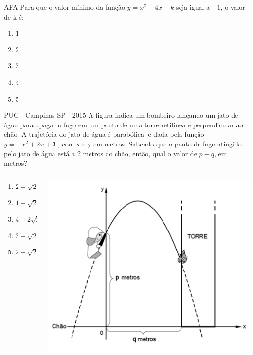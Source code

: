 \documentclass[11pt]{beamer}
\newif\ifgab
\newcommand{\gab}[1]{%
  \ifgab
    \textcolor{red!80!black}{\textbf{#1}}%
  \else
    #1%
  \fi
}
\begin{document}
\begin{frame}{AFA}
    Para que o valor mínimo da função $y=x^{2}-4x+k$ seja igual a $-1$, o valor de k é:

    \begin{enumerate}[a]
        \item 1
        \item 2
        \item \gab{3} %
        \item 4
        \item 5
    \end{enumerate}
\end{frame}

\begin{frame}{PUC - Campinas SP - 2015}
    A figura indica um bombeiro lançando um jato de água para apagar o fogo em um ponto de uma torre retilínea e perpendicular ao chão. A trajetória do jato de água é parabólica, e dada pela função $y = -x^{2} + 2x + 3$ , com x e y em metros. Sabendo que o ponto de fogo atingido pelo jato de água está a 2 metros do chão, então, qual o valor de $p-q$, em metros?

    \begin{columns}
        \begin{column}{0.4\textwidth}
            \begin{enumerate}[a]
                \item $2+\sqrt{2}$ 
                \item $1+\sqrt{2}$  
                \item $4-2\sqrt{2}$
                \item $3-\sqrt{2}$ 
                \item \gab{$2-\sqrt{2}$} %
            \end{enumerate}
        \end{column}

        \begin{column}{0.6\textwidth}
            \centering
            \includegraphics[width=0.75\linewidth]{imagens/q20.png}
        \end{column}
    \end{columns}
\end{frame}
\end{document}
